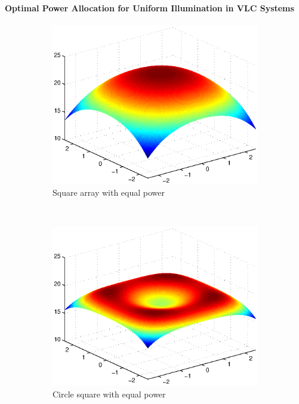 \documentclass{beamer}
\theoremstyle{remark}
\begin{document}
\begin{frame}
\frametitle{\,}
\framesubtitle{Optimal Power Allocation for Uniform Illumination in VLC Systems}
\begin{figure}[!]
\centering
\begin{subfigure}{0.3\columnwidth}
\includegraphics[width=\columnwidth]{c4_sqArr_SNR_Eq}
\caption{Square array with equal power}
\end{subfigure}~
\begin{subfigure}{0.3\columnwidth}
\includegraphics[width=\columnwidth]{c4_cirSq_SNR_Eq}
\caption{Circle square with equal power}
\end{subfigure}~
\begin{subfigure}{0.3\columnwidth}

\end{subfigure}
\end{figure}
\end{frame}
\end{document}
